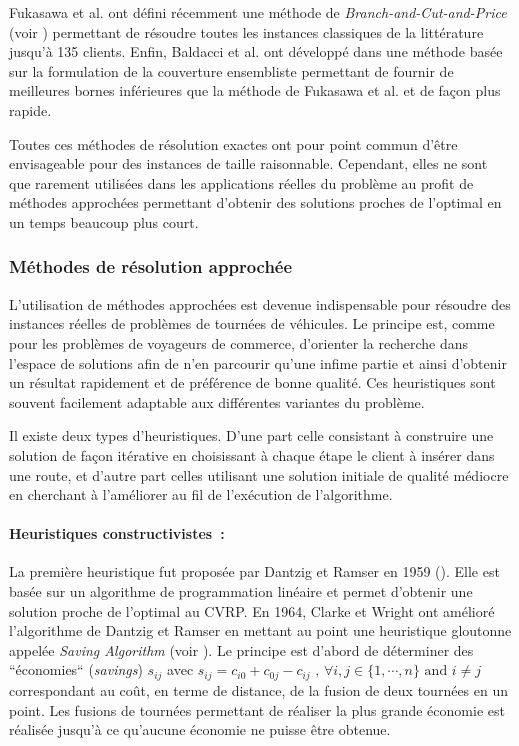 Fukasawa et al. ont défini récemment une méthode de \textit{Branch-and-Cut-and-Price} (voir \cite{Fukasawa2006}) permettant de résoudre toutes les instances classiques de la littérature jusqu'à 135 clients.  Enfin, Baldacci et al. ont développé dans \cite{Baldacci2008b} une méthode basée sur la formulation de la couverture ensembliste permettant de fournir de meilleures bornes inférieures que la méthode de Fukasawa et al. et de façon plus rapide.

Toutes ces méthodes de résolution exactes ont pour point commun d'être envisageable pour des instances de taille raisonnable. Cependant, elles ne sont que rarement utilisées dans les applications réelles du problème au profit de méthodes approchées permettant d'obtenir des solutions proches de l'optimal en un temps beaucoup plus court.

\subsubsection{Méthodes de résolution approchée}

L'utilisation de méthodes approchées est devenue indispensable pour résoudre des instances réelles de problèmes de tournées de véhicules. Le principe est, comme pour les problèmes de voyageurs de commerce, d'orienter la recherche dans l'espace de solutions afin de n'en parcourir qu'une infime partie et ainsi d'obtenir un résultat rapidement et de préférence de bonne qualité. Ces heuristiques sont souvent facilement adaptable aux différentes variantes du problème.

Il existe deux types d'heuristiques. D'une part celle consistant à construire une solution de façon itérative en choisissant à chaque étape le client à insérer dans une route, et d'autre part celles utilisant une solution initiale de qualité médiocre en cherchant à l'améliorer au fil de l'exécution de l'algorithme.

\paragraph{Heuristiques constructivistes~:}

La première heuristique fut proposée par Dantzig et Ramser en 1959 (\cite{Dantzig1959}). Elle est basée sur un algorithme de programmation linéaire et permet d'obtenir une solution proche de l'optimal au CVRP. En 1964, Clarke et Wright ont amélioré l'algorithme de Dantzig et Ramser en mettant au point une heuristique gloutonne appelée \textit{Saving Algorithm} (voir \cite{Clarke1964}). Le principe est d'abord de déterminer des ``économies`` (\textit{savings}) $s_{ij}$ avec $s_{ij}=c_{i0}+c_{0j}-c_{ij} \text{ , } \forall i,j \in \{1,\cdots,n\} \text{ and } i \neq j$ correspondant au coût, en terme de distance, de la fusion de deux tournées en un point. Les fusions de tournées permettant de réaliser la plus grande économie est réalisée jusqu'à ce qu'aucune économie ne puisse être obtenue.


